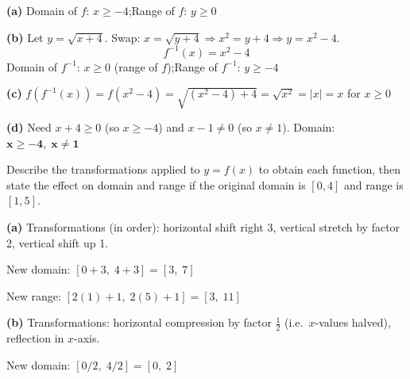 \documentclass[addpoints]{exam}
\begin{document}
\begin{questions}
\begin{solution}[9cm]
\textbf{(a)} Domain of $f$: $x \geq -4$;\quad Range of $f$: $y \geq 0$

\textbf{(b)} Let $y = \sqrt{x+4}$. Swap: $x = \sqrt{y+4} \Rightarrow x^2 = y+4 \Rightarrow y = x^2 - 4$.
\[
f^{-1}(x) = x^2 - 4
\]
Domain of $f^{-1}$: $x \geq 0$ (range of $f$);\quad Range of $f^{-1}$: $y \geq -4$

\textbf{(c)} $f(f^{-1}(x)) = f(x^2-4) = \sqrt{(x^2-4)+4} = \sqrt{x^2} = |x| = x$
for $x \geq 0$ \checkmark

\textbf{(d)} Need $x + 4 \geq 0$ (so $x \geq -4$) and $x - 1 \neq 0$ (so $x \neq 1$).
Domain: $\mathbf{x \geq -4,\; x \neq 1}$
\end{solution}

\question Describe the transformations applied to $y = f(x)$ to obtain each function,
then state the effect on domain and range if the original domain is $[0, 4]$ and
range is $[1, 5]$.
\begin{solution}[9cm]
\textbf{(a)} Transformations (in order): horizontal shift right 3, vertical stretch by
factor 2, vertical shift up 1.

New domain: $[0+3,\; 4+3] = [3,\; 7]$

New range: $[2(1)+1,\; 2(5)+1] = [3,\; 11]$

\textbf{(b)} Transformations: horizontal compression by factor $\tfrac{1}{2}$
(i.e.\ $x$-values halved), reflection in $x$-axis.

New domain: $[0/2,\; 4/2] = [0,\; 2]$


\end{solution}
\end{questions}
\end{document}
